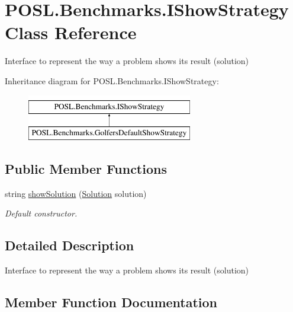 \hypertarget{interfacePOSL_1_1Benchmarks_1_1IShowStrategy}{}\section{P\+O\+S\+L.\+Benchmarks.\+I\+Show\+Strategy Class Reference}
\label{interfacePOSL_1_1Benchmarks_1_1IShowStrategy}


Interface to represent the way a problem shows its result (solution)  


Inheritance diagram for P\+O\+S\+L.\+Benchmarks.\+I\+Show\+Strategy\+:\begin{figure}[H]
\begin{center}
\leavevmode
\includegraphics[height=2.000000cm]{interfacePOSL_1_1Benchmarks_1_1IShowStrategy}
\end{center}
\end{figure}
\subsection*{Public Member Functions}
\begin{DoxyCompactItemize}
\item 
string \hyperlink{interfacePOSL_1_1Benchmarks_1_1IShowStrategy_afee02368af80da9bc782bb0ec1e72844}{show\+Solution} (\hyperlink{classPOSL_1_1Data_1_1Solution}{Solution} solution)
\begin{DoxyCompactList}\small\item\em Default constructor. \end{DoxyCompactList}\end{DoxyCompactItemize}


\subsection{Detailed Description}
Interface to represent the way a problem shows its result (solution) 

\subsection{Member Function Documentation}
\mbox{\label{interfacePOSL_1_1Benchmarks_1_1IShowStrategy_afee02368af80da9bc782bb0ec1e72844}} 
